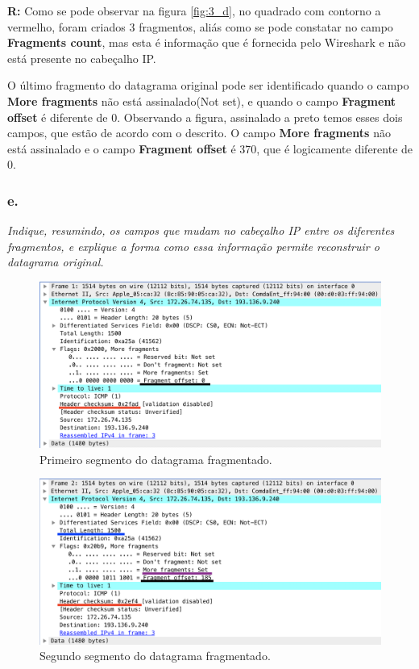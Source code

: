\documentclass{llncs}
\begin{document}
\textbf{R:} Como se pode observar na figura \ref{fig:3_d}, no quadrado com contorno a vermelho, foram criados 3 fragmentos, aliás como se pode constatar no campo \textbf{Fragments count}, mas esta é informação que é fornecida pelo Wireshark e não está presente no cabeçalho IP.

O último fragmento do datagrama original pode ser identificado quando o campo \textbf{More fragments} não está assinalado(Not set), e quando o campo \textbf{Fragment offset} é diferente de 0. Observando a figura, assinalado a preto temos esses dois campos, que estão de acordo com o descrito. O campo \textbf{More fragments} não está assinalado e o campo \textbf{Fragment offset} é 370, que é logicamente diferente de 0.

\subsubsection{e.}
\emph{Indique, resumindo,
os
campos 
que 
mudam  no  cabeçalho  IP
entre  os 
diferentes fragmentos, e 
explique
a forma como essa informação permite 
reconstruir o datagrama original.}

\begin{figure}[H]
\begin{center}
\includegraphics[scale=0.40]{3_e1.png} 
\end{center}
\caption{\label{fig:3_e1}Primeiro segmento do datagrama fragmentado.}
\end{figure}

\begin{figure}[H]
\begin{center}
\includegraphics[scale=0.40]{3_e2.png} 
\end{center}
\caption{\label{fig:3_e2}Segundo segmento do datagrama fragmentado.}
\end{figure}
\end{document}
